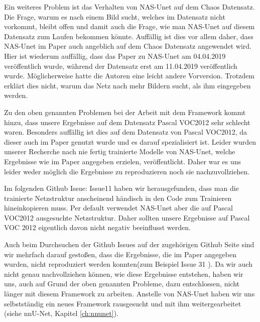 Ein weiteres Problem ist das Verhalten von NAS-Unet auf dem Chaos Datensatz. Die Frage, warum es nach einem Bild sucht, welches im Datensatz nicht vorkommt, bleibt offen und damit auch die Frage, wie man NAS-Unet auf diesem Datensatz zum Laufen bekommen könnte. Auffällig ist dies vor allem daher, dass NAS-Unet im Paper auch angeblich auf dem Chaos Datensatz angewendet wird. Hier ist wiederum auffällig, dass das Paper zu NAS-Unet am 04.04.2019 veröffentlich wurde, während der Datensatz erst am 11.04.2019 veröffentlich wurde. Möglicherweise hatte die Autoren eine leicht andere Vorversion. Trotzdem erklärt dies nicht, warum das Netz nach mehr Bildern sucht, als ihm eingegeben werden.

Zu den oben genannten Problemen bei der Arbeit mit dem Framework kommt hinzu, dass unsere Ergebnisse auf dem Datensatz Pascal VOC2012 sehr schlecht waren. Besonders auffällig ist dies auf dem Datensatz von Pascal VOC2012, da dieser auch im Paper genutzt wurde und es darauf spezialisiert ist. Leider wurden unserer Recherche nach nie fertig trainierte Modelle von NAS-Unet, welche Ergebnisse wie im Paper angegeben erzielen, veröffentlicht. Daher war es uns leider weder möglich die Ergebnisse zu reproduzieren noch sie nachzuvollziehen.

Im folgenden Github Issue: Issue11 \cite{nasunetGithubIssue11} haben wir herausgefunden, dass man die trainierte Netzstruktur anscheinend händisch in den Code zum Trainieren hineinkopieren muss. Per default verwendet NAS-Unet aber die auf Pascal VOC2012 ausgesuchte Netzstruktur. Daher sollten unsere Ergebnisse auf Pascal VOC 2012 eigentlich davon nicht negativ beeinflusst werden.

Auch beim Durchsuchen der Github Issues auf der zugehörigen Github Seite \cite{nasunetGithub}  sind wir mehrfach darauf gestoßen, dass die Ergebnisse, die im Paper angegeben wurden, nicht reproduziert werden konnten(zum Beispiel Issue 31 \cite{nasunetGithubIssue31}). Da wir auch nicht genau nachvollziehen können, wie diese Ergebnisse entstehen, haben wir uns, auch auf Grund der oben genannten Probleme, dazu entschlossen, nicht länger mit diesem Framework zu arbeiten. Anstelle von NAS-Unet haben wir uns selbstständig ein neues Framework rausgesucht und mit ihm weitergearbeitet (siehe nnU-Net, Kapitel \ref{ch:nnunet}). 



